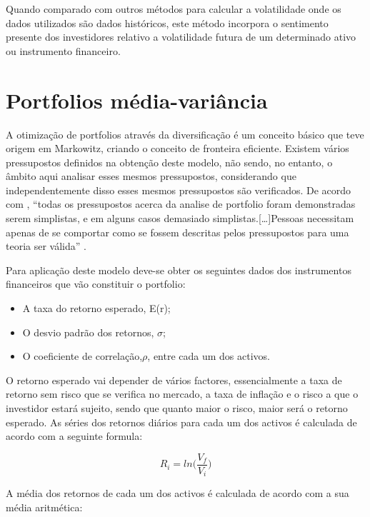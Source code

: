 \documentclass[
  12pt,
  a4paper,
  openany]{book}
\providecommand{\tightlist}{%
  \setlength{\itemsep}{0pt}\setlength{\parskip}{0pt}}
\begin{document}
Quando comparado com outros métodos para calcular a volatilidade onde os dados utilizados são dados históricos, este método incorpora o sentimento presente dos investidores relativo a volatilidade futura de um determinado ativo ou instrumento financeiro.

\hypertarget{portfolios-muxe9dia-variuxe2ncia}{%
\section{Portfolios média-variância}\label{portfolios-muxe9dia-variuxe2ncia}}

A otimização de portfolios através da diversificação é um conceito básico que teve origem em Markowitz, criando o conceito de fronteira eficiente. Existem vários pressupostos definidos na obtenção deste modelo, não sendo, no entanto, o âmbito aqui analisar esses mesmos pressupostos, considerando que independentemente disso esses mesmos pressupostos são verificados. De acordo com \citet{Modern2013}, ``todas os pressupostos acerca da analise de portfolio foram demonstradas serem simplistas, e em alguns casos demasiado simplistas.{[}\ldots{]}Pessoas necessitam apenas de se comportar como se fossem descritas pelos pressupostos para uma teoria ser válida'' \citep[pp.5]{Modern2013}.

Para aplicação deste modelo deve-se obter os seguintes dados dos instrumentos financeiros que vão constituir o portfolio:

\begin{itemize}
\tightlist
\item
  A taxa do retorno esperado, E(r);
\item
  O desvio padrão dos retornos, \(\sigma\);
\item
  O coeficiente de correlação,\(\rho\), entre cada um dos activos.
\end{itemize}

O retorno esperado vai depender de vários factores, essencialmente a taxa de retorno sem risco que se verifica no mercado, a taxa de inflação e o risco a que o investidor estará sujeito, sendo que quanto maior o risco, maior será o retorno esperado.
As séries dos retornos diários para cada um dos activos é calculada de acordo com a seguinte formula:

\begin{equation} 
  R_i = ln\Big(\frac{V_f}{V_i}\Big)
  \label{eq:logRet}
\end{equation}

A média dos retornos de cada um dos activos é calculada de acordo com a sua média aritmética:
\end{document}
